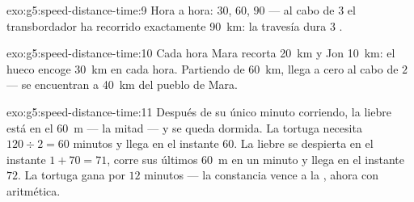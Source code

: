 \begin{solution}{exo:g5:speed-distance-time:9}
Hora a hora: $30$, $60$, $90$ --- al cabo de $3$  el
transbordador ha recorrido exactamente \qty{90}{km}: la travesía dura
$3$ .
\end{solution}

\begin{solution}{exo:g5:speed-distance-time:10}
Cada hora Mara recorta \qty{20}{km} y Jon \qty{10}{km}: el hueco
encoge \qty{30}{km} en cada hora. Partiendo de \qty{60}{km}, llega a
cero al cabo de $2$  --- se encuentran a \qty{40}{km} del pueblo
de Mara.
\end{solution}

\begin{solution}{exo:g5:speed-distance-time:11}
Después de su único minuto corriendo, la liebre está en el
\qty{60}{m} --- la mitad --- y se queda dormida. La tortuga necesita
$120 \div 2 = 60$ minutos y llega en el instante $60$. La liebre se
despierta en el instante $1 + 70 = 71$, corre sus últimos \qty{60}{m}
en un minuto y llega en el instante $72$. La tortuga gana por $12$
minutos --- la constancia vence a la , ahora con aritmética.
\end{solution}
